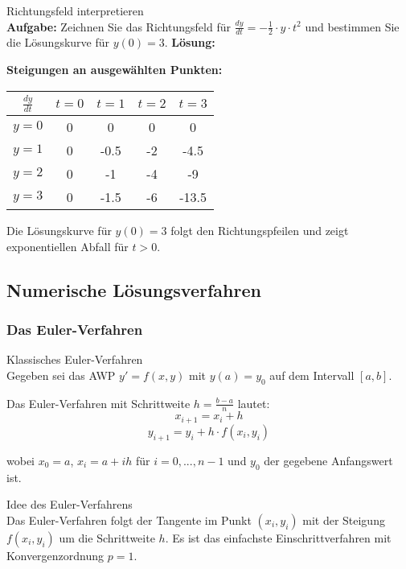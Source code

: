 \begin{example2}{Richtungsfeld interpretieren}\\
\textbf{Aufgabe:} Zeichnen Sie das Richtungsfeld für $\frac{dy}{dt} = -\frac{1}{2} \cdot y \cdot t^2$ und bestimmen Sie die Lösungskurve für $y(0) = 3$.
\tcblower
\textbf{Lösung:}

\textbf{Steigungen an ausgewählten Punkten:}
\begin{center}
\begin{tabular}{|c|c|c|c|c|}
\hline
$\frac{dy}{dt}$ & $t=0$ & $t=1$ & $t=2$ & $t=3$ \\
\hline
$y=0$ & 0 & 0 & 0 & 0 \\
\hline
$y=1$ & 0 & -0.5 & -2 & -4.5 \\
\hline
$y=2$ & 0 & -1 & -4 & -9 \\
\hline
$y=3$ & 0 & -1.5 & -6 & -13.5 \\
\hline
\end{tabular}
\end{center}

Die Lösungskurve für $y(0) = 3$ folgt den Richtungspfeilen und zeigt exponentiellen Abfall für $t > 0$.
\end{example2}

\subsection{Numerische Lösungsverfahren}

\subsubsection{Das Euler-Verfahren}

\begin{theorem}{Klassisches Euler-Verfahren}\\
Gegeben sei das AWP $y' = f(x,y)$ mit $y(a) = y_0$ auf dem Intervall $[a,b]$.

Das Euler-Verfahren mit Schrittweite $h = \frac{b-a}{n}$ lautet:
$$x_{i+1} = x_i + h$$
$$y_{i+1} = y_i + h \cdot f(x_i, y_i)$$

wobei $x_0 = a$, $x_i = a + ih$ für $i = 0, ..., n-1$ und $y_0$ der gegebene Anfangswert ist.
\end{theorem}

\begin{concept}{Idee des Euler-Verfahrens}\\
Das Euler-Verfahren folgt der Tangente im Punkt $(x_i, y_i)$ mit der Steigung $f(x_i, y_i)$ um die Schrittweite $h$. Es ist das einfachste Einschrittverfahren mit Konvergenzordnung $p = 1$.
\end{concept}

